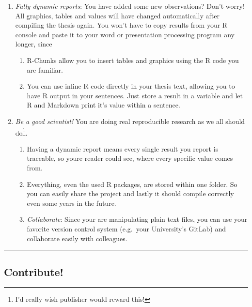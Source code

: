\documentclass[]{book}
\providecommand{\tightlist}{%
  \setlength{\itemsep}{0pt}\setlength{\parskip}{0pt}}
\let\rmarkdownfootnote\footnote%
\def\footnote{\protect\rmarkdownfootnote}
\theoremstyle{definition}
\theoremstyle{definition}
\theoremstyle{remark}
\begin{document}
\begin{enumerate}
\def\labelenumi{\arabic{enumi}.}
\tightlist
\item
  \emph{Fully dynamic reports}: You have added some new observations?
  Don't worry! All graphics, tables and values will have changed
  automatically after compiling the thesis again. You won't have to copy
  results from your R console and paste it to your word or presentation
  processing program any longer, since

  \begin{enumerate}
  \def\labelenumii{\alph{enumii}.}
  \tightlist
  \item
    R-Chunks allow you to insert tables and graphics using the R code
    you are familiar.
  \item
    You can use inline R code directly in your thesis text, allowing you
    to have R output in your sentences. Just store a result in a
    variable and let R and Markdown print it's value within a sentence.
  \end{enumerate}
\item
  \emph{Be a good scientist!} You are doing real reproducible research
  as we all should do\footnote{I'd really wish publisher would reward
    this!}.

  \begin{enumerate}
  \def\labelenumii{\alph{enumii}.}
  \tightlist
  \item
    Having a dynamic report means every single result you report is
    traceable, so youre reader could see, where every specific value
    comes from.
  \item
    Everything, even the used R packages, are stored within one folder.
    So you can easily share the project and lastly it should compile
    correctly even some years in the future.
  \item
    \emph{Collaborate}: Since your are manipulating plain text files,
    you can use your favorite version control system (e.g.~your
    University's GitLab) and collaborate easily with colleagues.
  \end{enumerate}
\end{enumerate}

\begin{center}\rule{0.5\linewidth}{\linethickness}\end{center}

\subsection*{Contribute!}\label{contribute}
\end{document}
